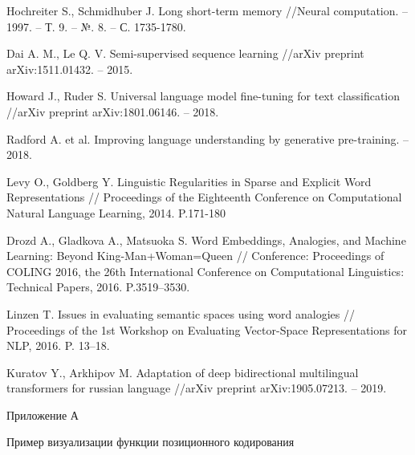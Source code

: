 \documentclass[a4paper,14pt]{article}
\begin{document}
\begin{thebibliography}{30}
Hochreiter S., Schmidhuber J. Long short-term memory //Neural computation. – 1997. – Т. 9. – №. 8. – С. 1735-1780.

Dai A. M., Le Q. V. Semi-supervised sequence learning //arXiv preprint arXiv:1511.01432. – 2015.

Howard J., Ruder S. Universal language model fine-tuning for text classification //arXiv preprint arXiv:1801.06146. – 2018.

Radford A. et al. Improving language understanding by generative pre-training. – 2018.

Levy O., Goldberg Y. Linguistic Regularities in Sparse and Explicit Word 	Representations // Proceedings of the Eighteenth Conference on Computational Natural Language Learning, 2014. P.171-180

Drozd A., Gladkova A., Matsuoka S. Word Embeddings, Analogies, and Machine Learning: Beyond King-Man+Woman=Queen // Conference: Proceedings of COLING 2016, the 26th International Conference on Computational Linguistics: Technical Papers, 2016. 
P.3519–3530.

Linzen T. Issues in evaluating semantic spaces using word analogies // Proceedings of the 1st Workshop on Evaluating Vector-Space Representations for NLP, 2016. P. 13–18.

Kuratov Y., Arkhipov M. Adaptation of deep bidirectional multilingual transformers for russian language //arXiv preprint arXiv:1905.07213. – 2019.


\end{thebibliography}

\newpage


\begin{flushright}
	Приложение А
\end{flushright}


\begin{center}
	Пример визуализации функции позиционного кодирования
\end{center}
\end{document}
